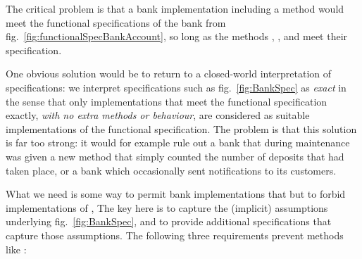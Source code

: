  
The critical problem is that a bank implementation including a 
method would meet the functional specifications of the bank from
fig.~\ref{fig:functionalSpecBankAccount}, so long as the methods ,
, and     meet
their specification.

One obvious solution would be to return to a closed-world
interpretation of specifications: we interpret specifications such as
fig.~\ref{fig:BankSpec} as \emph{exact} in the sense that only
implementations that meet the functional specification exactly,
\emph{with no extra methods or behaviour}, are considered as suitable
implementations of the functional specification. The problem is that
this solution is far too strong: it would for example rule out a bank
that  during maintenance was given a new method 
that simply counted the number of deposits that had taken place,
or a bank which occasionally sent notifications  to its customers.
%
%


What we need is some way to permit bank implementations that 
 but to forbid implementations of , %
The key here is to capture the (implicit)
assumptions underlying fig.~\ref{fig:BankSpec}, and to provide
additional specifications that capture those assumptions.  The following
 three requirements   prevent methods like :

